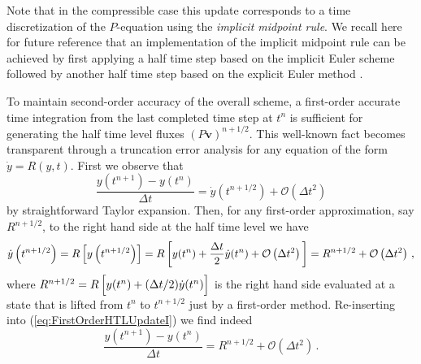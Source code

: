 \documentclass{ametsoc}
\theoremstyle{definition}
\newcommand{\eq}[1]{(\ref{#1})}
\newcommand{\vect}[1]{{\mathbf{#1}}}
\newcommand{\vv}{\vect{v}}
\newcommand{\half}{1/2}
\newcommand{\dt}{\Delta t}
\newcommand{\bigoh}[1]{\mathcal{O}\left(#1\right)}
\begin{document}
Note that in the compressible case this update corresponds to a time 
discretization of the $P$-equation
using the \emph{implicit midpoint rule}. We recall here for future reference that
an implementation of the implicit midpoint rule can be achieved by first applying
a half time step based on the implicit Euler scheme followed by another half time
step based on the explicit Euler method \citep{HairerEtAl2006}.

To maintain second-order accuracy of the overall scheme, a first-order accurate 
time integration from the last completed time step at $t^n$ is sufficient for 
generating the half time level fluxes $(P\vv)^{n+\half}$. This well-known fact becomes transparent through a truncation error analysis for any equation of 
the form $\dot y = R(y,t)$. First we observe that
%
\begin{equation}\label{eq:FirstOrderHTLUpdateI}
\frac{y(t^{n+1})-y(t^n)}{\dt} = \dot y\left(t^{n+\half}\right) + \bigoh{\dt^2}
\end{equation}
%
by straightforward Taylor expansion. Then, for any first-order approximation, 
say $R^{n+\half}$, to the right hand side at the half time level we have  
%
\begin{equation}\label{eq:FirstOrderHTLUpdateII}
\dot y\left(t^{n+\half}\right) 
= R\left[y\left(t^{n+\half}\right)\right] 
= R\left[y(t^n) + \frac{\Delta t}{2} \dot y(t^n) + \bigoh{\Delta t^2}\rule{0pt}{12pt}\right]
= R^{n+\half} + \bigoh{\dt^2}\,,
\end{equation}
%
where $R^{n+\half} = R\left[y(t^n) + (\Delta t/2) \dot y(t^n)\rule{0pt}{10pt}\right]$ is the right hand side evaluated at a state that is lifted from $t^n$ to $t^{n+\half}$ just by a first-order method. Re-inserting into \eq{eq:FirstOrderHTLUpdateI} we find indeed
%
\begin{equation}
\frac{y(t^{n+1})-y(t^n)}{\dt} = R^{n+\half} + \bigoh{\dt^2}\, .
\end{equation}
%
\end{document}
